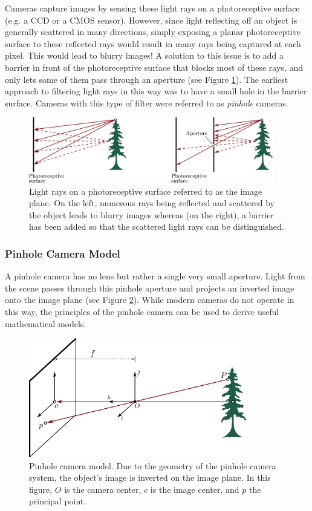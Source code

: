 Cameras capture images by sensing these light rays on a photoreceptive surface (e.g. a CCD or a CMOS sensor). However, since light reflecting off an object is generally scattered in many directions, simply exposing a planar photoreceptive surface to these reflected rays would result in many rays being captured at each pixel. This would lead to blurry images! A solution to this issue is to add a barrier in front of the photoreceptive surface that blocks most of these rays, and only lets some of them pass through an aperture (see Figure \ref{fig:LightRays}). 
The earliest approach to filtering light rays in this way was to have a small hole in the barrier surface. Cameras with this type of filter were referred to as \textit{pinhole} cameras.
\begin{figure}[ht]
\centering
\includegraphics[width=0.95\textwidth]{tex/figs/ch08_figs/pinhole.png}
\caption{Light rays on a photoreceptive surface referred to as the image plane. On the left, numerous rays being reflected and scattered by the object leads to blurry images whereas (on the right), a barrier has been added so that the scattered light rays can be distinguished.}
\label{fig:LightRays}
\end{figure}


\subsubsection{Pinhole Camera Model} 
A pinhole camera has no lens but rather a single very small aperture. Light from the scene passes through this pinhole aperture and projects an inverted image onto the image plane (see Figure \ref{fig:PinholeMath}). While modern cameras do not operate in this way, the principles of the pinhole camera can be used to derive useful mathematical models. 

\begin{figure}[ht]
\centering
\includegraphics[width=0.85\textwidth]{tex/figs/ch08_figs/pinholecamera.png}
\caption{Pinhole camera model. Due to the geometry of the pinhole camera system, the object's image is inverted on the image plane. In this figure, $O$ is the camera center, $c$ is the image center, and $p$ the principal point.}
\label{fig:PinholeMath}
\end{figure}

